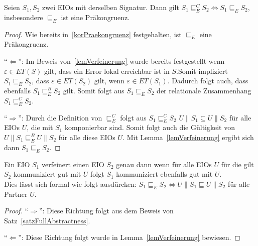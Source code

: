 \begin{satz}
  \label{satzFullAbstractness}
  Seien $S_1, S_2$ zwei EIOs mit derselben Signatur. Dann gilt $S_1\sqsubseteq
  _E^C S_2\Leftrightarrow S_1\sqsubseteq _E S_2$, insbesondere $\sqsubseteq _E$
  ist eine Präkongruenz.
\end{satz}

\begin{proof}
  Wie bereits in~\ref{korPraekongruenz} festgehalten, ist $\sqsubseteq _E$ eine
  Präkongruenz.

  ``$\Leftarrow$'': Im Beweis von~\ref{lemVerfeinerung} wurde bereits festgestellt wenn
      $\varepsilon\in ET(S)$ gilt, dass ein Error lokal erreichbar ist in
      $S$.Somit impliziert $S_1\sqsubseteq _E S_2$, dass $\varepsilon\in
      ET(S_2)$ gilt, wenn $\varepsilon\in ET(S_1)$. Dadurch folgt auch, dass
      ebenfalls $S_1\sqsubseteq _E^B S_2$ gilt. Somit folgt aus $S_1\sqsubseteq
      _E S_2$ der relationale Zusammenhang $S_1\sqsubseteq _E^C S_2$.

  ``$\Rightarrow$'': Durch die Definition von $\sqsubseteq _E^C$ folgt aus
  $S_1\sqsubseteq _E^C S_2$ $U\|S_1\subseteq U\|S_2$ für alle EIOs $U$, die mit
  $S_1$ komponierbar sind. Somit folgt auch die Gültigkeit von
  $U\|S_1\sqsubseteq _E^B U\|S_2$ für alle diese EIOs $U$. Mit
  Lemma~\ref{lemVerfeinerung} ergibt sich dann $S_1\sqsubseteq _E S_2$.
\end{proof}

\begin{kor}
  Ein EIO $S_1$ verfeinert einen EIO $S_2$ genau dann wenn für alle EIOs $U$
  für die gilt $S_2$ kommuniziert gut mit $U$ folgt $S_1$ kommuniziert
  ebenfalls gut mit $U$.\\
  Dies lässt sich formal wie folgt ausdürcken: $S_1\sqsubseteq _E S_2
  \Leftrightarrow U\|S_1\sqsubseteq U\|S_2$ für alle Partner $U$.
\end{kor}

\begin{proof}
  ``$\Rightarrow$'': Diese Richtung folgt aus dem Beweis von
  Satz~\ref{satzFullAbstractness}.

  ``$\Leftarrow$'': Diese Richtung folgt wurde in Lemma~\ref{lemVerfeinerung}
  bewiesen.
\end{proof}
